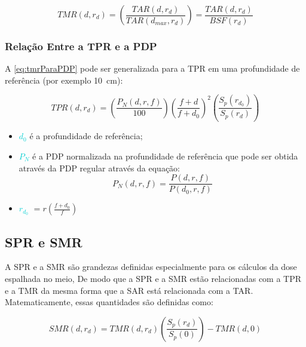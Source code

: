 \documentclass[11pt,a4paper]{article}
\newcounter{exemplo}
\begin{document}
        \begin{equation}
            TMR(d,r_d) = \left(\frac{TAR(d, r_d)}{TAR(d_{max}, r_d)}\right) = \frac{TAR(d,r_d)}{BSF(r_d)}
            \label{eq:tmrTar}
        \end{equation}

    \subsubsection*{Relação Entre a TPR e a PDP}

    A \ref{eq:tmrParaPDP} pode ser generalizada para a TPR em uma profundidade de referência (por exemplo \qty{10}{cm}):

        \begin{equation}
            TPR(d, r_d) =  \left(\frac{P_N(d, r, f)}{100}\right) \left(\frac{f + d}{f + d_0}\right)^2 \left(\frac{S_p(r_{d_0})}{S_p(r_d)}\right)
        \end{equation}

    \begin{exemplo}[onde:]
        \begin{itemize}
            \item \textcolor{DarkTurquoise}{$d_0$} é a profundidade de referência;
            \item \textcolor{DarkTurquoise}{$P_N$} é a PDP normalizada na profundidade de referência que pode ser obtida através da PDP regular através da equação: 
            $$P_N(d, r, f) = \frac{P(d, r, f)}{P(d_0, r, f)}$$
            \item \textcolor{DarkTurquoise}{$r_{d_0}$} $= r\left(\frac{f + d_0}{f}\right)$
        \end{itemize}
    \end{exemplo}

    \subsection*{SPR e SMR}

    A SPR e a SMR são grandezas definidas especialmente para os cálculos da dose espalhada no meio, De modo que a SPR e a SMR estão relacionadas com a TPR e a TMR da mesma forma que a SAR está relacionada com a TAR.  Matematicamente, essas quantidades são definidas como:

        \begin{equation}
            SMR(d, r_d) = TMR(d, r_d) \left(\frac{S_p(r_d)}{S_p(0)}\right) - TMR(d,0)
            \label{eq:smrTmr}
        \end{equation}
\end{document}
